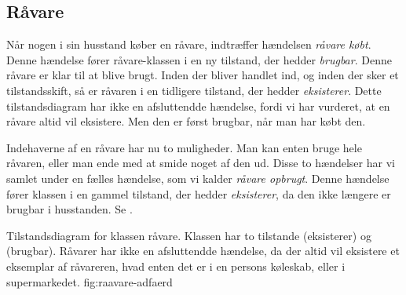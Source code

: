 \subsection{Råvare}
Når nogen i sin husstand køber en råvare, indtræffer hændelsen \textit{råvare købt}. Denne hændelse fører råvare-klassen i en ny tilstand, der hedder \textit{brugbar}. Denne råvare er klar til at blive brugt. Inden der bliver handlet ind, og inden der sker et tilstandsskift, så er råvaren i en tidligere tilstand, der hedder \textit{eksisterer}. Dette tilstandsdiagram har ikke en afsluttendde hændelse, fordi vi har vurderet, at en råvare altid vil eksistere. Men den er først brugbar, når man har købt den. 

Indehaverne af en råvare har nu to muligheder. Man kan enten bruge hele råvaren, eller man ende med at smide noget af den ud. Disse to hændelser har vi samlet under en fælles hændelse, som vi kalder \textit{råvare opbrugt}. Denne hændelse fører klassen i en gammel tilstand, der hedder \textit{eksisterer}, da den ikke længere er brugbar i husstanden. Se .

  {Tilstandsdiagram for klassen råvare. Klassen har to tilstande (eksisterer) og (brugbar). Råvarer har ikke en afsluttendde hændelse, da der altid vil eksistere et eksemplar af råvareren, hvad enten det er i en persons køleskab, eller i supermarkedet.}
  {fig:raavare-adfaerd}

